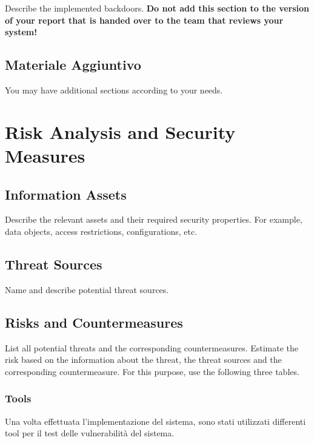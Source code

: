 \documentclass{article}
\begin{document}
Describe the implemented backdoors. {\bfseries Do not add
    this section to the version of your report that is handed over to
    the team that reviews your system!}

\subsection{Materiale Aggiuntivo}

You may have additional sections according to your needs.


\section{Risk Analysis and Security Measures}

\subsection{Information Assets}

Describe the relevant assets and their required security
  properties. For example, data objects, access restrictions,
  configurations, etc.

\subsection{Threat Sources}

Name and describe potential threat sources.

\subsection{Risks and Countermeasures}

List all potential threats and the
  corresponding countermeasures. Estimate the risk based on 
  the information about the threat, the threat sources and the 
  corresponding countermeasure. For this purpose, use the following three
  tables.

\subsubsection{Tools}
Una volta effettuata l'implementazione del sistema, sono stati utilizzati differenti tool per il test delle vulnerabilità del sistema.
\end{document}
